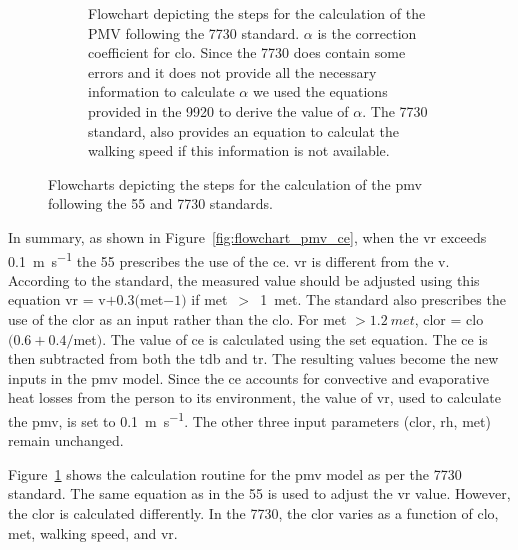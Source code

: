 \begin{figure}[!htb]
\begin{subfigure}[b]{\textwidth}
        \caption{Flowchart depicting the steps for the calculation of the PMV following the \gls{7730} standard.
            $\alpha$ is the correction coefficient for \acs{clo}.
            Since the \gls{7730} does contain some errors and it does not provide all the necessary information to calculate $\alpha$ we used the equations provided in the \gls{9920} to derive the value of $\alpha$.
        The \gls{7730} standard, also provides an equation to calculat the walking speed if this information is not available.
        }
        \label{fig:flowchart_pmv_iso}
    \end{subfigure}
    \caption{Flowcharts depicting the steps for the calculation of the \ac{pmv} following the \gls{55} and \gls{7730} standards.}
    \label{fig:flowchart_pmv_calculation}
\end{figure}
In summary, as shown in Figure~\ref{fig:flowchart_pmv_ce}, when the \ac{vr} exceeds \qty{0.1}{\m\per\s} the \gls{55} prescribes the use of the \ac{ce}.
\ac{vr} is different from the \ac{v}.
According to the standard, the measured value should be adjusted using this equation \ac{vr} = \ac{v}$+ 0.3 ($\acs{met}$-1)$ if \ac{met}~$>$~\qty{1}{met}.
The standard also prescribes the use of the \ac{clor} as an input rather than the \ac{clo}.
For \ac{met} $> \qty{1.2}{met}$, \acs{clor} = \acs{clo}$(0.6 + 0.4/$\acs{met}$)$.
The value of \ac{ce} is calculated using the \ac{set} equation.
The \ac{ce} is then subtracted from both the \ac{tdb} and \ac{tr}.
The resulting values become the new inputs in the \ac{pmv} model.
Since the \ac{ce} accounts for convective and evaporative heat losses from the person to its environment, the value of \ac{vr}, used to calculate the \ac{pmv}, is set to \qty{0.1}{\m\per\s}.
The other three input parameters (\ac{clor}, \ac{rh}, \ac{met}) remain unchanged.

Figure~\ref{fig:flowchart_pmv_iso} shows the calculation routine for the \ac{pmv} model as per the \gls{7730} standard.
The same equation as in the \gls{55} is used to adjust the \ac{vr} value.
However, the \ac{clor} is calculated differently.
In the \gls{7730}, the \ac{clor} varies as a function of \ac{clo}, \ac{met}, walking speed, and \ac{vr}.

